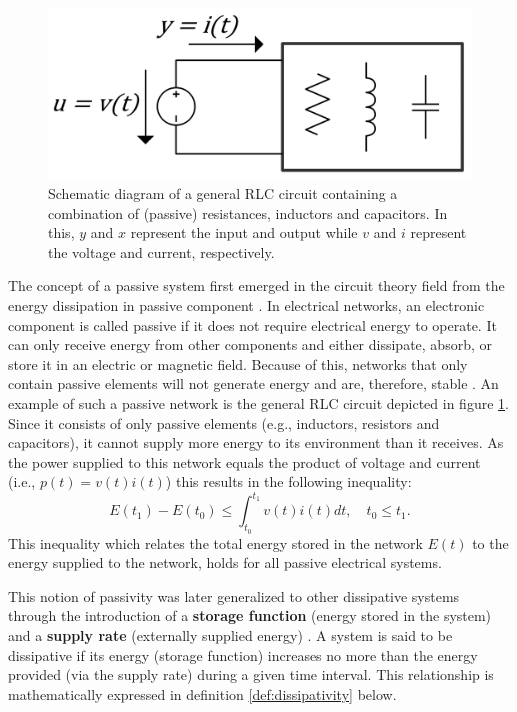 \begin{figure}
  \centering
  \includegraphics[width=0.55\linewidth]{figures/RLC_circuit.png}
  \caption[Schematic diagram of a general RLC circuit.]{Schematic diagram of a general RLC circuit containing a combination of (passive) resistances, inductors and capacitors. In this, $y$ and $x$ represent the input and output while $v$ and $i$ represent the voltage and current, respectively.} \label{fig:rlc_circuit}
\end{figure}

The concept of a passive system first emerged in the circuit theory field from the energy dissipation in passive component \cite{popovHyperstabilityControlSystems1973}. In electrical networks, an electronic component is called passive if it does not require electrical energy to operate. It can only receive energy from other components and either dissipate, absorb, or store it in an electric or magnetic field. Because of this, networks that only contain passive elements will not generate energy and are, therefore, stable \cite{andersonNetworkAnalysisSynthesis2013}. An example of such a passive network is the general RLC circuit depicted in figure \ref{fig:rlc_circuit}. Since it consists of only passive elements (e.g., inductors, resistors and capacitors), it cannot supply more energy to its environment than it receives. As the power supplied to this network equals the product of voltage and current (i.e., $p \left( t \right)= v \left( t \right) i \left( t \right)$) this results in the following inequality:
\begin{equation}
  E \left( t_1 \right)- E \left( t_0 \right)\le\int_{ t_0 }^{ t_1 } v \left( t \right) i \left( t \right)dt, \quad t_0 \le t_1.
\end{equation}
This inequality which relates the total energy stored in the network $E\left(t\right)$ to the energy supplied to the network, holds for all passive electrical systems.

This notion of passivity was later generalized to other dissipative systems through the introduction of a \textbf{storage function} (energy stored in the system) and a \textbf{supply rate} (externally supplied energy) \cite{willemsDissipativeDynamicalSystems1972a,willemsDissipativeDynamicalSystems1972}. A system is said to be dissipative if its energy (storage function) increases no more than the energy provided (via the supply rate) during a given time interval. This relationship is mathematically expressed in definition \ref{def:dissipativity} below.

